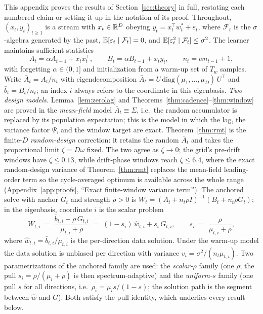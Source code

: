 This appendix proves the results of Section~\ref{sec:theory} in full, restating each numbered claim or setting it up in the notation of its proof.
Throughout, $(x_t, y_t)_{t \ge 1}$ is a stream with $x_t \in \mathbb{R}^D$ obeying
$y_t = x_t^\top w^*_t + \varepsilon_t$, where $\mathcal F_t$ is the $\sigma$-algebra generated by the past, $\mathbb{E}[\varepsilon_t \mid \mathcal F_t] = 0$, and $\mathbb{E}[\varepsilon_t^2 \mid \mathcal F_t] \le \sigma^2$.
The learner maintains sufficient statistics
\[
  A_t = \alpha A_{t-1} + x_t x_t^\top, \qquad
  B_t = \alpha B_{t-1} + x_t y_t, \qquad
  n_t = \alpha n_{t-1} + 1,
\]
with forgetting $\alpha \in (0,1]$ and initialization from a warm-up set of $T_w$ samples.
Write $\bar A_t = A_t/n_t$ with eigendecomposition $\bar A_t = U\,\mathrm{diag}(\mu_1,\dots,\mu_D)\,U^\top$ and $\bar b_t = B_t/n_t$; an index $i$ always refers to the coordinate in this eigenbasis.
\emph{Two design models.} Lemma~\ref{lem:zerolag} and Theorems~\ref{thm:cadence}--\ref{thm:window} are proved in the \emph{mean-field} model $\bar A_t \equiv \Sigma$, i.e.\ the random accumulator is replaced by its population expectation; this is the model in which the lag, the variance factor $\Psi$, and the window target are exact. Theorem~\ref{thm:rmt} is the finite-$D$ \emph{random-design} correction: it retains the random $\bar A_t$ and takes the proportional limit $\zeta = D\omega$ fixed. The two agree as $\zeta \to 0$; the grid's pre-drift windows have $\zeta \le 0.13$, while drift-phase windows reach $\zeta \le 6.4$, where the exact random-design variance of Theorem~\ref{thm:rmt} replaces the mean-field leading-order term so the cycle-averaged optimum is available across the whole range (Appendix~\ref{app:proofs}, ``Exact finite-window variance term'').
The anchored solve with anchor $G_t$ and strength $\rho > 0$ is $W_t = (A_t + n_t\rho I)^{-1}(B_t + n_t\rho G_t)$; in the eigenbasis, coordinate $i$ is the scalar problem
\begin{equation}
\label{eq:app-anchored}
  W_{t,i} \;=\; \frac{\bar b_{t,i} + \rho\,G_{t,i}}{\mu_{t,i} + \rho}
  \;=\; (1 - s_i)\,\widehat w_{t,i} + s_i\,G_{t,i},
  \qquad
  s_i \;=\; \frac{\rho}{\mu_{t,i} + \rho},
\end{equation}
where $\widehat w_{t,i} = \bar b_{t,i}/\mu_{t,i}$ is the per-direction data solution.
Under the warm-up model the data solution is unbiased per direction with variance $v_i = \sigma^2/(n_t \mu_{t,i})$.
Two parametrizations of the anchored family are used: the \emph{scalar-$\rho$} family (one $\rho$; the pull $s_i = \rho/(\mu_i + \rho)$ is then spectrum-adaptive) and the \emph{uniform-$s$} family (one pull $s$ for all directions, i.e.\ $\rho_i = \mu_i s/(1-s)$; the solution path is the segment between $\widehat w$ and $G$).
Both satisfy the pull identity, which underlies every result below.

